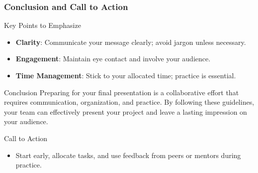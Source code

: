 \documentclass[aspectratio=169]{beamer}
\begin{document}
\begin{frame}[fragile]
    \frametitle{Conclusion and Call to Action}
    \begin{block}{Key Points to Emphasize}
        \begin{itemize}
            \item \textbf{Clarity}: Communicate your message clearly; avoid jargon unless necessary.
            \item \textbf{Engagement}: Maintain eye contact and involve your audience.
            \item \textbf{Time Management}: Stick to your allocated time; practice is essential.
        \end{itemize}
    \end{block}

    \begin{block}{Conclusion}
        Preparing for your final presentation is a collaborative effort that requires communication, organization, and practice. By following these guidelines, your team can effectively present your project and leave a lasting impression on your audience.
    \end{block}

    \begin{block}{Call to Action}
        \begin{itemize}
            \item Start early, allocate tasks, and use feedback from peers or mentors during practice.
        \end{itemize}
    \end{block}
\end{frame}
\end{document}
